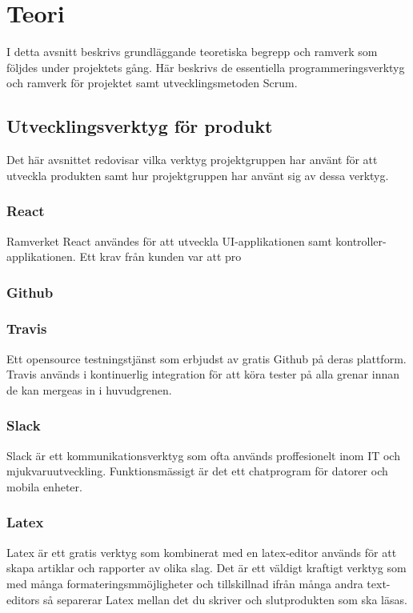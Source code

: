 \chapter{Teori}
\label{cha:theory}
I detta avsnitt beskrivs grundläggande teoretiska begrepp och ramverk som följdes under projektets gång. Här beskrivs de essentiella programmeringsverktyg och ramverk för projektet samt utvecklingsmetoden Scrum. 
\section{Utvecklingsverktyg för produkt}
Det här avsnittet redovisar vilka verktyg projektgruppen har använt för att utveckla produkten samt hur projektgruppen har använt sig av dessa verktyg.

\subsection*{React}
Ramverket React användes för att utveckla UI-applikationen samt kontroller-applikationen. Ett krav från kunden var att pro
\subsection*{Github}


\subsection*{Travis}
Ett opensource testningstjänst som erbjudst av gratis Github på deras plattform. Travis används i kontinuerlig integration för att köra tester på alla grenar innan de kan mergeas in i huvudgrenen.

\subsection*{Slack}
Slack är ett kommunikationsverktyg som ofta används proffesionelt inom IT och mjukvaruutveckling. Funktionsmässigt är det ett chatprogram för datorer och mobila enheter.

\subsection*{Latex}
Latex är ett gratis verktyg som kombinerat med en latex-editor används för att skapa artiklar och rapporter av olika slag. Det är ett väldigt kraftigt verktyg som med många formateringsmmöjligheter och tillskillnad ifrån många andra text-editors så separerar Latex mellan det du skriver och slutprodukten som ska läsas.
